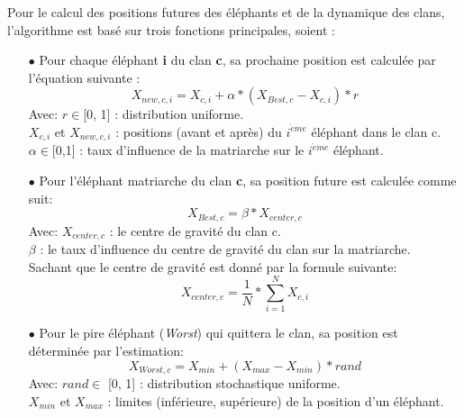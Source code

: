 Pour le calcul des positions futures des éléphants et de la dynamique des clans, l'algorithme est basé sur trois fonctions principales, soient :

\begin{itemize}
	\item[$\bullet$] Pour chaque éléphant \textbf{i} du clan \textbf{c}, sa prochaine position est calculée par l'équation suivante :
	\begin{equation}
	\label{eq:xnew}
	{X}_{new,c, i} = {X}_{c, i}  +  \alpha *( {X}_{Best,c}- {X}_{c, i} ) * r 
	\end{equation}
	Avec:
	$r \in $[0, 1] : distribution uniforme.\\
	${X}_{c, i}$ et ${X}_{new,c, i}$ : positions (avant et après) du $i^{\grave{e}me}$ éléphant dans le clan c.\\ 
	$\alpha \in $[0,1] : taux d'influence de la matriarche sur le $i^{\grave{e}me}$ éléphant.\\
	
	\item[$\bullet$] Pour l'éléphant matriarche du clan \textbf{c}, sa position future est calculée comme suit:
	\begin{equation}
	\label{eq:xbest}
	{X}_{Best,c}  =  \beta  *  {X}_{center,c} 
	\end{equation}
	Avec: 
	${X}_{center,c}$ : le centre de gravité du clan c.\\
	$\beta$ : le taux d'influence du centre de gravité du clan sur la matriarche.\\
	
	Sachant que le centre de gravité est donné par la formule suivante:
	\begin{equation}
	\label{eq:xcenter}
	{X}_{center,c}  = \frac{1}{N} * \sum_{i=1}^{N} {X}_{c,i}
	\end{equation}
	
	\item[$\bullet$] Pour le pire éléphant (\textit{Worst}) qui quittera le clan, sa position est déterminée par l'estimation:
	\begin{equation}
	\label{eq:xworst}
	{X}_{Worst,c}  =  {X}_{min} + ({X}_{max} - {X}_{min}) * rand
	\end{equation}
	Avec:
	$rand \in $ [0, 1]  : distribution stochastique uniforme.\\
	${X}_{min}$ et ${X}_{max}$ : limites (inférieure, supérieure) de la position d'un éléphant.
\end{itemize}


